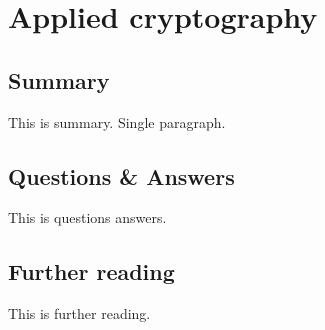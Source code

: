 \section{Applied cryptography}

\subsection{Summary}
This is summary. Single paragraph.

\subsection{Questions \& Answers}
This is questions answers.

\subsection{Further reading}
This is further reading.
